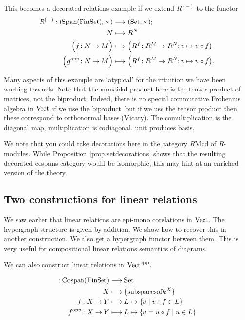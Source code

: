 This becomes a decorated relations example if we extend $R^{(-)}$ to the functor
\begin{align*}
  R^{(-)}: (\mathrm{Span(FinSet)},\times) &\longrightarrow (\mathrm{Set},\times); \\
  N &\longmapsto R^N \\
  \Big(f{\colon} N \to M\Big) &\longmapsto \Big(R^f{\colon} R^M \to R^N; v \mapsto v \circ
  f\big) \\
  \Big(g^{\mathrm{opp}}{\colon} N\to M\Big) &\longmapsto \Big(R^f{\colon} R^M \to R^N; v \mapsto v \circ
  f\big).
\end{align*}


Many aspects of this example are `atypical' for the intuition we have been
working towards.  Note that the monoidal product here is the tensor product of
matrices, not the biproduct. Indeed, there is no special commutative Frobenius
algebra in $\mathrm{Vect}$ if we use the biproduct, but if we use the tensor product
then these correspond to orthonormal bases (Vicary). The comultiplication is the
diagonal map, multiplication is codiagonal. unit produces basis.

We note that you could take decorations here in the category $R\mathrm{Mod}$ of
$R$-modules. While Proposition \ref{prop.setdecorations} shows that the
resulting decorated cospans category would be isomorphic, this may hint at an
enriched version of the theory.

\subsection{Two constructions for linear relations}

We saw earlier that linear relations are epi-mono corelations in $\mathrm{Vect}$. The
hypergraph structure is given by addition. We show how to recover this in
another construction. We also get a hypergraph functor between them. This is
very useful for compositional linear relations semantics of diagrams.

We can also construct linear relations in $\mathrm{Vect}^{\mathrm{opp}}$.

\begin{align*}
  {\colon}\mathrm{Cospan}(\mathrm{FinSet}) &\longrightarrow \mathrm{Set} \\
  X &\longmapsto \{\mathrm{subspaces of }k^X\} \\
  f: X \to Y &\longmapsto L \mapsto \{v \mid v\circ f \in L\} \\
  f^{\mathrm{opp}}: X \to Y &\longmapsto L \mapsto \{v = u \circ f \mid u \in L\}
\end{align*}

